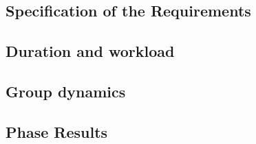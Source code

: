 \subsection{Specification of the Requirements}

\subsection{Duration and workload}

\subsection{Group dynamics}

\subsection{Phase Results}

